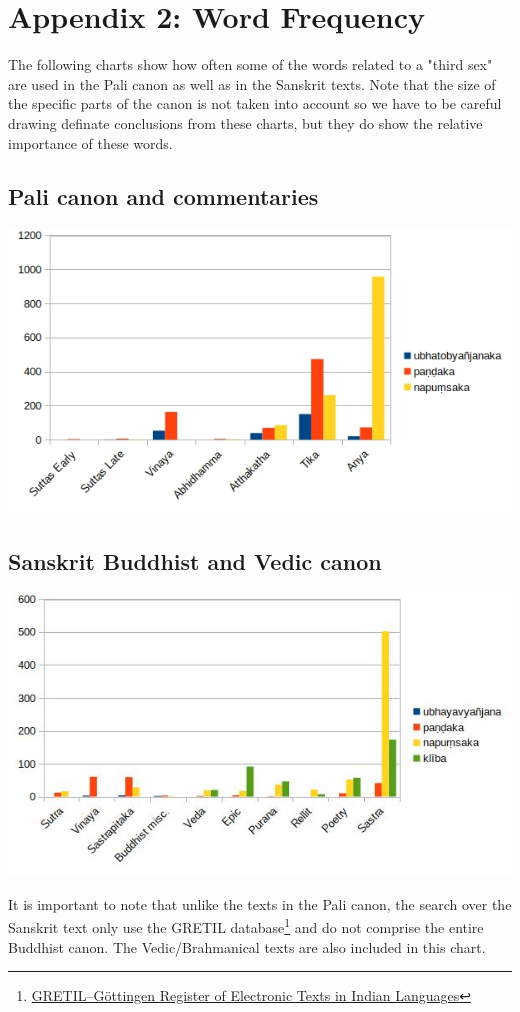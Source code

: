 \section{Appendix 2: Word Frequency}
\label{appendix2}

The following charts show how often some of the words related to a "third sex" are used in the Pali canon as well as in the Sanskrit texts. Note that the size of the specific parts of the canon is not taken into account so we have to be careful drawing definate conclusions from these charts, but they do show the relative importance of these words. 

\subsection{Pali canon and commentaries}

\includegraphics[width=\linewidth]{pali.jpg}
\label{pali1}

\subsection{Sanskrit Buddhist and Vedic canon}

\includegraphics[width=\linewidth]{sanskrit.jpg}
\label{sanskrit1}

\medskip
It is important to note that unlike the texts in the Pali canon, the search over the Sanskrit text only use the GRETIL database\footnote{\href{http://gretil.sub.uni-goettingen.de/gretil.html}{GRETIL--Göttingen Register of Electronic Texts in Indian Languages}} and do not comprise the entire Buddhist canon. The Vedic/Brahmanical texts are also included in this chart.




